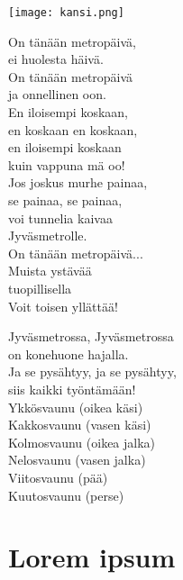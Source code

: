 \documentclass[a4paper,12pt,oneside]{lauluvihko}
\author{Heikki Pitkänen}
\date{04.12.2014}
\begin{document}
   \thispagestyle{empty}
   \vfill
    \begin{center}
      \texttt{[image: kansi.png]}
    \end{center}
   \vfill
   \newpage
   \tableofcontents
   \newpage
\begin{multicols}{2}

On tänään metropäivä,\\ 
ei huolesta häivä.\\ 
On tänään metropäivä\\ 
ja onnellinen oon.\\ 

En iloisempi koskaan,\\ 
en koskaan en koskaan,\\ 
en iloisempi koskaan\\ 
kuin vappuna mä oo!\\ 

Jos joskus murhe painaa,\\ 
se painaa, se painaa,\\ 
voi tunnelia kaivaa\\ 
Jyväsmetrolle.\\ 

On tänään metropäivä...\\ 

Muista ystävää\\ 
tuopillisella\\ 
Voit toisen yllättää!\\ 


   Jyväsmetrossa, Jyväsmetrossa\\ 
on konehuone hajalla.\\ 
Ja se pysähtyy, ja se pysähtyy,\\ 
siis kaikki työntämään!\\ 

Ykkösvaunu (oikea käsi)\\ 
Kakkosvaunu (vasen käsi)\\ 
Kolmosvaunu (oikea jalka)\\ 
Nelosvaunu (vasen jalka)\\ 
Viitosvaunu (pää)\\ 
Kuutosvaunu (perse)\\ 

   \section{Lorem ipsum}
   \blindtext %


\end{multicols}
\end{document}
